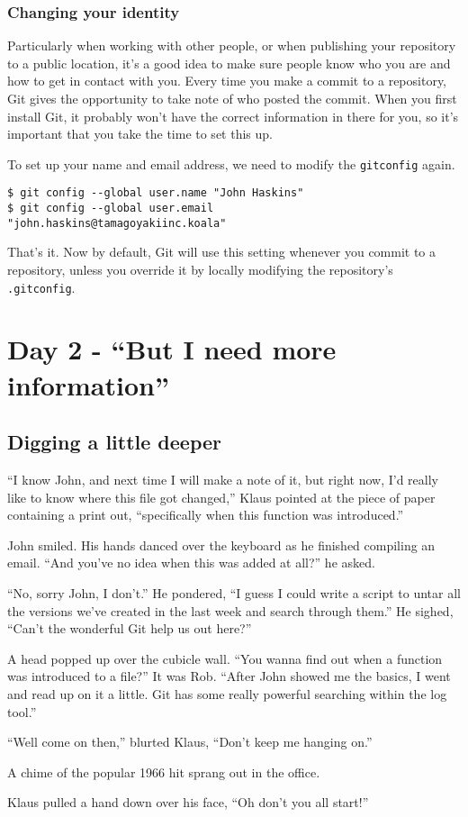 \begin{framed}
\subsubsection{Changing your identity}
Particularly when working with other people, or when publishing your repository to a public location, it's a good idea to make sure people know who you are and how to get in contact with you.  Every time you make a commit to a repository, Git gives the opportunity to take note of who posted the commit.  When you first install Git, it probably won't have the correct information in there for you, so it's important that you take the time to set this up.

To set up your name and email address, we need to modify the \texttt{gitconfig} again.  

\begin{Verbatim}[frame=leftline,framerule=1mm,fontsize=\relsize{-3}] 
$ git config --global user.name "John Haskins"
$ git config --global user.email 
"john.haskins@tamagoyakiinc.koala"
\end{Verbatim}

That's it.  Now by default, Git will use this setting whenever you commit to a repository, unless you override it by locally modifying the repository's \texttt{.gitconfig}.
\end{framed}

\section{Day 2 - ``But I need more information''}
\subsection{Digging a little deeper}

\begin{trenches}
``I know John, and next time I will make a note of it, but right now, I'd really like to know where this file got changed,'' Klaus pointed at the piece of paper containing a print out, ``specifically when this function was introduced.''

John smiled.  His hands danced over the keyboard as he finished compiling an email.  ``And you've no idea when this was added at all?'' he asked.

``No, sorry John, I don't.''  He pondered, ``I guess I could write a script to untar all the versions we've created in the last week and search through them.''  He sighed, ``Can't the wonderful Git help us out here?''

A head popped up over the cubicle wall.  ``You wanna find out when a function was introduced to a file?''  It was Rob.  ``After John showed me the basics, I went and read up on it a little.  Git has some really powerful searching within the log tool.''

``Well come on then,'' blurted Klaus, ``Don't keep me hanging on.''

A chime of the popular 1966 hit sprang out in the office.

Klaus pulled a hand down over his face, ``Oh don't you all start!''
\end{trenches}

